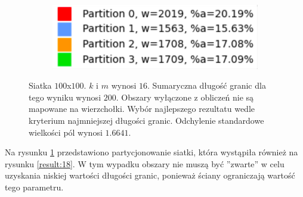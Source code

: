 \begin{figure}[h]
\begin{subfigure}{.33\textwidth}
    \caption[short]{}
\end{subfigure}
\begin{subfigure}{.33\textwidth}
    \centering
    \includegraphics[width=0.9\linewidth]{images/results/m/5/results}
    \caption[short]{}
\end{subfigure}
\caption{Siatka $100$x$100$. $k$ i $m$ wynosi $16$.
Sumaryczna długość granic dla tego wyniku wynosi $200$.
Obszary wyłączone z obliczeń nie są mapowane na wierzchołki.
Wybór najlepszego rezultatu wedle kryterium najmniejszej długości granic.
Odchylenie standardowe wielkości pól wynosi $1.6641$.}
\label{result:m:5}
\end{figure}

Na rysunku \ref{result:m:5} przedstawiono partycjonowanie siatki, która wystąpiła również na rysunku \ref{result:18}.
W tym wypadku obszary nie muszą być ''zwarte'' w celu uzyskania niskiej wartości długości granic, ponieważ
ściany ograniczają wartość tego parametru.
